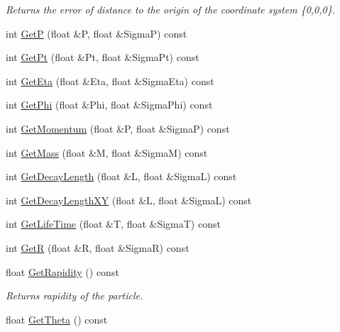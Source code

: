 \begin{DoxyCompactItemize}
\begin{DoxyCompactList}\small\item\em Returns the error of distance to the origin of the coordinate system \{0,0,0\}. \end{DoxyCompactList}\item 
int \hyperlink{classKFParticle_ac0c1bc6b565ecd917f2a9330f41cfe5d}{GetP} (float \&P, float \&SigmaP) const 
\item 
int \hyperlink{classKFParticle_a9c96532cca6b59748d3f0aec654a8222}{Get\+Pt} (float \&Pt, float \&Sigma\+Pt) const 
\item 
int \hyperlink{classKFParticle_acd6ab4335bdb19e5a19d5c8fbbce05d5}{Get\+Eta} (float \&Eta, float \&Sigma\+Eta) const 
\item 
int \hyperlink{classKFParticle_ad7fa64af32317b896b88b0d52a150e3e}{Get\+Phi} (float \&Phi, float \&Sigma\+Phi) const 
\item 
int \hyperlink{classKFParticle_ab56906105509354096f21b23e29f7c5d}{Get\+Momentum} (float \&P, float \&SigmaP) const 
\item 
int \hyperlink{classKFParticle_ac01d70176620a48b72b3055ba077b14b}{Get\+Mass} (float \&M, float \&SigmaM) const 
\item 
int \hyperlink{classKFParticle_afa35ea1e264003c5d9fb6156ffed0ce7}{Get\+Decay\+Length} (float \&L, float \&SigmaL) const 
\item 
int \hyperlink{classKFParticle_a7c7b8430c20031c4dd76bbf61b436c5f}{Get\+Decay\+Length\+XY} (float \&L, float \&SigmaL) const 
\item 
int \hyperlink{classKFParticle_a8940d04d0f1535747fc6b075c57d749e}{Get\+Life\+Time} (float \&T, float \&SigmaT) const 
\item 
int \hyperlink{classKFParticle_a66ecc36b47a517f64857d86b5d9b9364}{GetR} (float \&R, float \&SigmaR) const 
\item 
float \hyperlink{classKFParticle_a95ca9088ad71a47c08d17012f161a0ed}{Get\+Rapidity} () const \hypertarget{classKFParticle_a95ca9088ad71a47c08d17012f161a0ed}{}\label{classKFParticle_a95ca9088ad71a47c08d17012f161a0ed}

\begin{DoxyCompactList}\small\item\em Returns rapidity of the particle. \end{DoxyCompactList}\item 
float \hyperlink{classKFParticle_a887de78bd509e9cc0d09fe03fcd22f7d}{Get\+Theta} () const \hypertarget{classKFParticle_a887de78bd509e9cc0d09fe03fcd22f7d}{}\label{classKFParticle_a887de78bd509e9cc0d09fe03fcd22f7d}


\end{DoxyCompactItemize}
